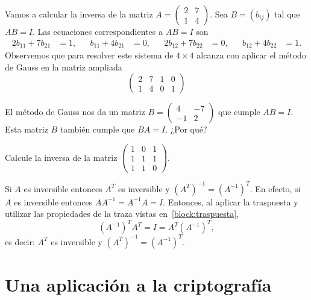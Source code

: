 \begin{example}
	Vamos a calcular la inversa de la matriz $A=\begin{pmatrix}2 & 7\\1 &
		4\end{pmatrix}$. Sea $B=(b_{ij})$ tal que $AB=I$. Las ecuaciones
		correspondientes a $AB=I$ son
	\[
			\begin{aligned}
			2b_{11}+7b_{21}&=1, 
			&& 
			b_{11}+4b_{21}&=0, 
			&& 
			2b_{12}+7b_{22}&=0,
			&& 
			b_{12}+4b_{22}&=1.
		\end{aligned}
	\]
	Observemos que para resolver este sistema de $4\times 4$ alcanza con
	aplicar el método de Gauss en la matriz ampliada 
	\[
	\left(
	\begin{array}{cc|cc}
		2 & 7 & 1 & 0\\
		1 & 4 & 0 & 1
	\end{array}
	\right)
	\]

	El método de Gauss nos da un matriz 
	$B=\begin{pmatrix}
		4 & -7
		\\-1& 2
	\end{pmatrix}$
	que cumple $AB=I$. Esta matriz $B$ 
	también cumple que $BA=I$. ¿Por qué?
\end{example}

\begin{xca}
	Calcule la inversa de la matriz 
	$\begin{pmatrix}
		1 & 0 & 1\\
		1 & 1 & 1\\
		1 & 1 & 0
	\end{pmatrix}$.
\end{xca}

\begin{block}
    Si $A$ es inversible entonces $A^T$ es inversible y
    $(A^T)^{-1}=(A^{-1})^T$. En efecto, si $A$ es inversible entonces
    $AA^{-1}=A^{-1}A=I$. Entonces, al aplicar la traspuesta y
    utilizar las propiedades de la traza vistas en~\ref{block:traspuesta},
    \[
    (A^{-1})^TA^T=I=A^T(A^{-1})^T, 
    \]
    es decir: $A^T$ es inversible y $(A^T)^{-1}=(A^{-1})^T$.
\end{block}

\section{Una aplicación a la criptografía}

